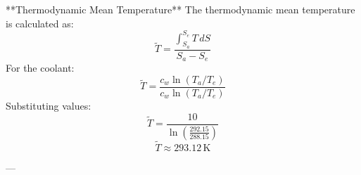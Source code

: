 **Thermodynamic Mean Temperature**  
The thermodynamic mean temperature is calculated as:  
\[
\tilde{T} = \frac{\int_{S_a}^{S_e} T \, dS}{S_a - S_e}
\]  
For the coolant:  
\[
\tilde{T} = \frac{c_w \ln \left( T_a / T_e \right)}{c_w \ln \left( T_a / T_e \right)}
\]  
Substituting values:  
\[
\tilde{T} = \frac{10}{\ln \left( \frac{292.15}{288.15} \right)}
\]  
\[
\tilde{T} \approx 293.12 \, \text{K}
\]  

---